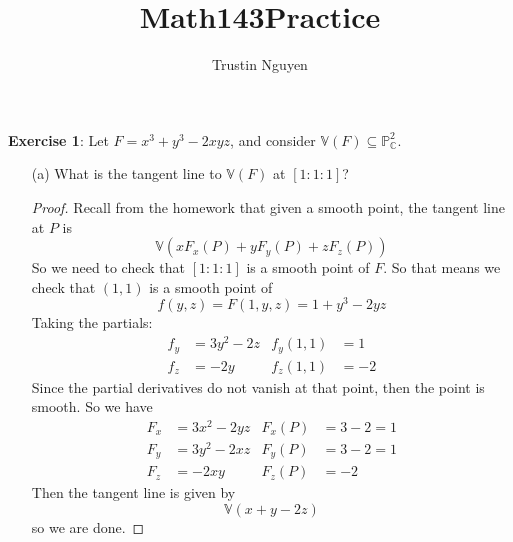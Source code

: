 \documentclass{article}
\title{Math143Practice}
\author{Trustin Nguyen}
\begin{document}
    \maketitle

\reversemarginpar

\textbf{Exercise 1}: Let $F = x^{3} + y^{3} - 2xyz$, and consider $\mathbb{V}(F) \subseteq\mathbb{P}_{\mathbb{C}}^{2}$.
    \begin{itemize}
        \item [(a)] What is the tangent line to $\mathbb{V}(F)$ at $[1 : 1 : 1]$?
            \begin{proof}
                Recall from the homework that given a smooth point, the tangent line at $P$ is 
                    \begin{equation*}
                        \mathbb{V}(xF_{x}(P) + yF_{y}(P) + zF_{z}(P))
                    \end{equation*}
                So we need to check that $[1 : 1 : 1]$ is a smooth point of $F$. So that means we check that $(1, 1)$ is a smooth point of
                    \begin{equation*}
                        f(y, z) = F(1, y, z) = 1 + y^{3} - 2yz
                    \end{equation*}
                Taking the partials:
                    \begin{align*}
                        f_{y} &= 3y^{2} - 2z & f_{y}(1, 1) &= 1 \\
                        f_{z} &= -2y         & f_{z}(1, 1) &= -2  
                    \end{align*}
                Since the partial derivatives do not vanish at that point, then the point is smooth. So we have 
                    \begin{align*}
                        F_{x} &= 3x^{2} - 2yz & F_{x}(P) &= 3 - 2 = 1 \\
                        F_{y} &= 3y^{2} - 2xz & F_{y}(P) &= 3 - 2 = 1 \\
                        F_{z} &= -2xy         & F_{z}(P) &= -2          
                    \end{align*}
                Then the tangent line is given by
                    \begin{equation*}
                        \mathbb{V}(x + y - 2z)
                    \end{equation*}
                so we are done.
            \end{proof}


\end{itemize}
\end{document}
